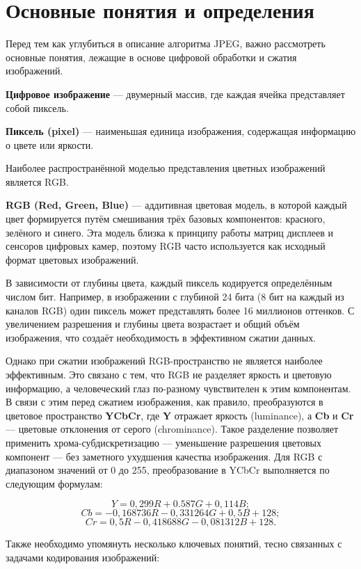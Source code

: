 \newpage
\section{Основные понятия и определения}

Перед тем как углубиться в описание алгоритма JPEG, важно рассмотреть основные понятия, лежащие в основе цифровой обработки и сжатия изображений.


\textbf{Цифровое изображение} — двумерный массив, где каждая ячейка представляет собой пиксель.
\IMageTable


\textbf{Пиксель (pixel)} — наименьшая единица изображения, содержащая информацию о цвете или яркости.
\PixelTable


Наиболее распространённой моделью представления цветных изображений является RGB.

\textbf{RGB (Red, Green, Blue)} — аддитивная цветовая модель, в которой каждый цвет формируется путём смешивания трёх базовых компонентов: красного, зелёного и синего. 
Эта модель близка к принципу работы матриц дисплеев и сенсоров цифровых камер, поэтому RGB часто используется как исходный формат цветовых изображений.

В зависимости от глубины цвета, каждый пиксель кодируется определённым числом бит. 
Например, в изображении с глубиной 24 бита (8 бит на каждый из каналов RGB) один пиксель может представлять более 16 миллионов оттенков. 
С увеличением разрешения и глубины цвета возрастает и общий объём изображения, что создаёт необходимость в эффективном сжатии данных.

Однако при сжатии изображений RGB-пространство не является наиболее эффективным. Это связано с тем, что RGB не разделяет яркость и цветовую информацию, а человеческий глаз по-разному чувствителен к этим компонентам. 
В связи с этим перед сжатием изображения, как правило, преобразуются в цветовое пространство \textbf{YCbCr}, где \textbf{Y} отражает яркость (luminance), а \textbf{Cb} и \textbf{Cr} — цветовые отклонения от серого (chrominance). 
Такое разделение позволяет применить хрома-субдискретизацию — уменьшение разрешения цветовых компонент — без заметного ухудшения качества изображения.
Для RGB с диапазоном значений от 0 до 255, преобразование в YCbCr выполняется по следующим формулам:

$$ Y = 0,299R + 0.587G + 0,114B; $$
$$ Cb = -0,168736R - 0,331264G + 0,5B + 128; $$ 
$$ Cr = 0,5R - 0,418688G - 0,081312B + 128. $$


Также необходимо упомянуть несколько ключевых понятий, тесно связанных с задачами кодирования изображений:

